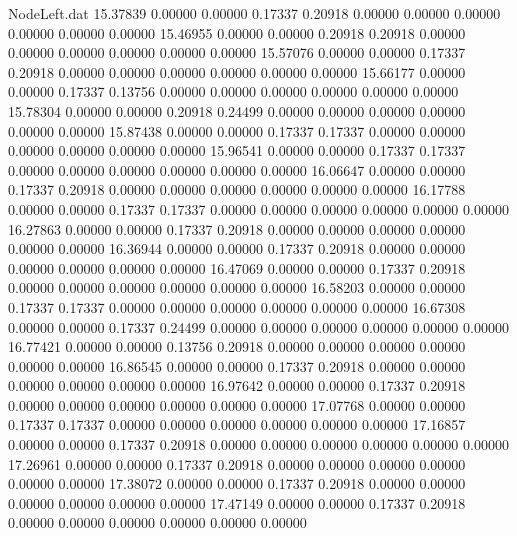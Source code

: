 \begin{filecontents}{NodeLeft.dat}
  15.37839    0.00000    0.00000     0.17337    0.20918    0.00000    0.00000    0.00000    0.00000    0.00000    0.00000
  15.46955    0.00000    0.00000     0.20918    0.20918    0.00000    0.00000    0.00000    0.00000    0.00000    0.00000
  15.57076    0.00000    0.00000     0.17337    0.20918    0.00000    0.00000    0.00000    0.00000    0.00000    0.00000
  15.66177    0.00000    0.00000     0.17337    0.13756    0.00000    0.00000    0.00000    0.00000    0.00000    0.00000
  15.78304    0.00000    0.00000     0.20918    0.24499    0.00000    0.00000    0.00000    0.00000    0.00000    0.00000
  15.87438    0.00000    0.00000     0.17337    0.17337    0.00000    0.00000    0.00000    0.00000    0.00000    0.00000
  15.96541    0.00000    0.00000     0.17337    0.17337    0.00000    0.00000    0.00000    0.00000    0.00000    0.00000
  16.06647    0.00000    0.00000     0.17337    0.20918    0.00000    0.00000    0.00000    0.00000    0.00000    0.00000
  16.17788    0.00000    0.00000     0.17337    0.17337    0.00000    0.00000    0.00000    0.00000    0.00000    0.00000
  16.27863    0.00000    0.00000     0.17337    0.20918    0.00000    0.00000    0.00000    0.00000    0.00000    0.00000
  16.36944    0.00000    0.00000     0.17337    0.20918    0.00000    0.00000    0.00000    0.00000    0.00000    0.00000
  16.47069    0.00000    0.00000     0.17337    0.20918    0.00000    0.00000    0.00000    0.00000    0.00000    0.00000
  16.58203    0.00000    0.00000     0.17337    0.17337    0.00000    0.00000    0.00000    0.00000    0.00000    0.00000
  16.67308    0.00000    0.00000     0.17337    0.24499    0.00000    0.00000    0.00000    0.00000    0.00000    0.00000
  16.77421    0.00000    0.00000     0.13756    0.20918    0.00000    0.00000    0.00000    0.00000    0.00000    0.00000
  16.86545    0.00000    0.00000     0.17337    0.20918    0.00000    0.00000    0.00000    0.00000    0.00000    0.00000
  16.97642    0.00000    0.00000     0.17337    0.20918    0.00000    0.00000    0.00000    0.00000    0.00000    0.00000
  17.07768    0.00000    0.00000     0.17337    0.17337    0.00000    0.00000    0.00000    0.00000    0.00000    0.00000
  17.16857    0.00000    0.00000     0.17337    0.20918    0.00000    0.00000    0.00000    0.00000    0.00000    0.00000
  17.26961    0.00000    0.00000     0.17337    0.20918    0.00000    0.00000    0.00000    0.00000    0.00000    0.00000
  17.38072    0.00000    0.00000     0.17337    0.20918    0.00000    0.00000    0.00000    0.00000    0.00000    0.00000
  17.47149    0.00000    0.00000     0.17337    0.20918    0.00000    0.00000    0.00000    0.00000    0.00000    0.00000

\end{filecontents}
